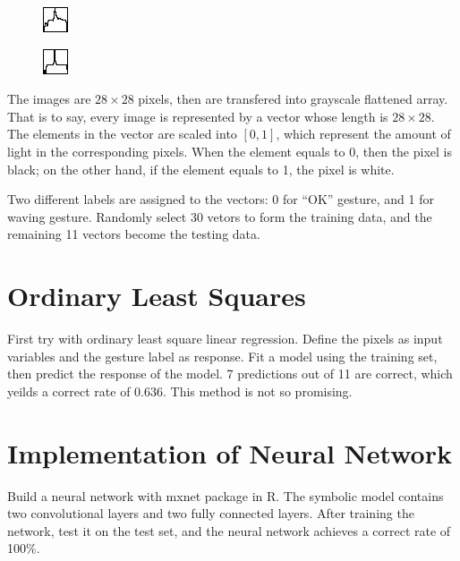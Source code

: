 \documentclass[format=acmsmall,review=false, screen=true, authorversion=true]{acmart}
\begin{document}
\begin{figure}[h]
\centering
\begin{minipage}{.49\textwidth}
  \centering
  \includegraphics[width=.1\linewidth]{ok1}
  \label{fig:eg1}
\end{minipage}
\begin{minipage}{.49\textwidth}
  \centering
  \includegraphics[width=.1\linewidth]{ok2}
  \label{fig:eg2}
\end{minipage}
\end{figure}

The images are $28 \times 28$ pixels, then are transfered into grayscale flattened array. That is to say, every image is represented by a vector whose length is $28 \times 28$. The elements in the vector are scaled into $[0, 1]$, which represent the amount of light in the corresponding pixels. When the element equals to 0, then the pixel is black; on the other hand, if the element equals to 1, the pixel is white. 

Two different labels are assigned to the vectors: 0 for   ``OK'' gesture, and 1 for waving gesture. Randomly select 30 vetors to form the training data, and the remaining 11 vectors become the testing data.
 
 
\section{Ordinary Least Squares}
First try with ordinary least square linear regression. Define the pixels as input variables and the gesture label as response. Fit a model using the training set, then predict the response of the model. 7 predictions out of 11 are correct, which yeilds a correct rate of 0.636. This method is not so promising. 

\section{Implementation of Neural Network}
Build a neural network with mxnet package in R. The symbolic model contains two convolutional layers and two fully connected layers.  After training the network, test it on the test set, and the neural network achieves a correct rate of 100\%.  
\end{document}
